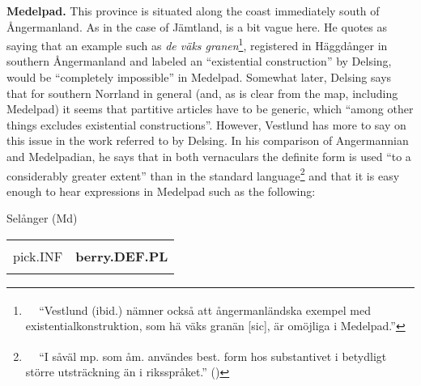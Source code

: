 \begin{styleBodytextheaded}
\textbf{Medelpad.} This province is situated along the coast immediately south of Ångermanland. As in the case of Jämtland, \citet[19]{Delsing2003a} is a bit vague here. He quotes \citet[21]{Vestlund1923} as saying that an example such as \textit{de väks granen}\footnote{\textsuperscript{\ \ } “Vestlund (ibid.) nämner också att ångermanländska exempel med existentialkonstruktion, som hä väks granän [sic], är omöjliga i Medelpad.”}, registered in Häggdånger in southern Ångermanland and labeled an “existential construction” by Delsing, would be “completely impossible” in Medelpad. Somewhat later, Delsing says that for southern Norrland in general (and, as is clear from the map, including Medelpad) it seems that partitive articles have to be generic, which “among other things excludes existential constructions”. However, Vestlund has more to say on this issue in the work referred to by Delsing. In his comparison of Angermannian and Medelpadian, he says that in both vernaculars the definite form is used “to a considerably greater extent” than in the standard language\footnote{\textsuperscript{\ \ } “I såväl mp. som åm. användes best. form hos substantivet i betydligt större utsträckning än i riksspråket.” (\citet[20]{Vestlund1923})} and that it is easy enough to hear expressions in Medelpad such as the following:

\end{styleBodytextheaded}

\begin{listWWNumileveli}
\item 

\begin{styleExample}
Selånger (Md)

\end{styleExample}

\end{listWWNumileveli}

\begin{listWWNumxxxileveli}
\item 

\end{listWWNumxxxileveli}

\begin{tabular}{ll}
\lsptoprule
\multicolumn{2}{l}{nôppä

}\\
pick.INF & {\bfseries berry.DEF.PL}\\
\lspbottomrule
\end{tabular}

